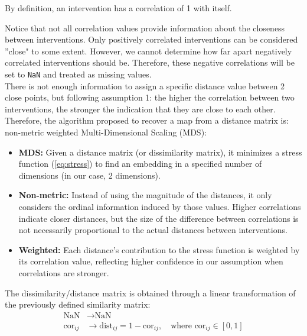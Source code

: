 \begin{remark}
    By definition, an intervention has a correlation of 1 with itself.
\end{remark}

Notice that not all correlation values provide information about the closeness between interventions. Only positively correlated interventions can be considered ''close" to some extent. However, we cannot determine how far apart negatively correlated interventions should be. Therefore, these negative correlations will be set to \texttt{NaN} and treated as missing values.\\

There is not enough information to assign a specific distance value between 2 close points, but following assumption 1: the higher the correlation between two interventions, the stronger the indication that they are close to each other. Therefore, the algorithm proposed to recover a map from a distance matrix is: non-metric weighted Multi-Dimensional Scaling (MDS):

\begin{itemize}
    \item \textbf{MDS:} Given a distance matrix (or dissimilarity matrix), it minimizes a stress function (\ref{eq:stress}) to find an embedding in a specified number of dimensions (in our case, 2 dimensions).
    \item \textbf{Non-metric:} Instead of using the magnitude of the distances, it only considers the ordinal information induced by those values. Higher correlations indicate closer distances, but the size of the difference between correlations is not necessarily proportional to the actual distances between interventions.
    \item \textbf{Weighted:} Each distance's contribution to the stress function is weighted by its correlation value, reflecting higher confidence in our assumption when correlations are stronger.
\end{itemize}

\begin{remark}
    The dissimilarity/distance matrix is obtained through a linear transformation of the previously defined similarity matrix:
    \begin{align*}
        \text{NaN} &\rightarrow \text{NaN} \\
        \text{cor}_{ij} &\rightarrow \text{dist}_{ij} = 1-\text{cor}_{ij}, \quad \text{where } \text{cor}_{ij} \in [0,1]
    \end{align*}
\end{remark}


